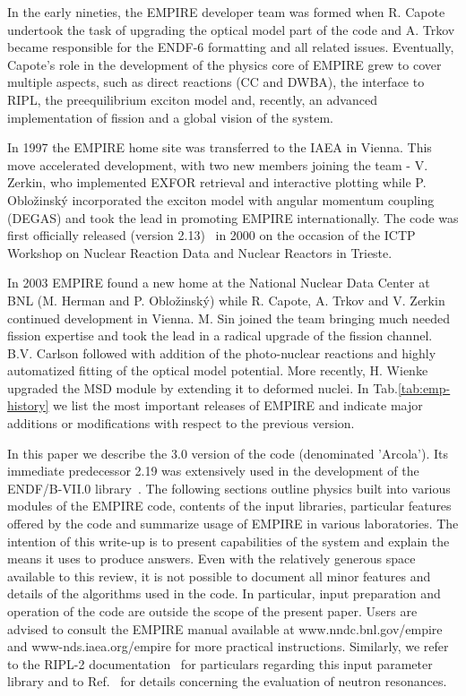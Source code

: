In the early nineties, the EMPIRE developer team was formed when R. Capote
undertook the task of upgrading the optical model part of the code and A.
Trkov became responsible for the ENDF-6 formatting and all related issues.
Eventually, Capote's role in the development of the physics core of EMPIRE
grew to cover multiple aspects, such as direct reactions (CC and
DWBA), the interface to RIPL, the preequilibrium exciton model and,
recently, an advanced
implementation of fission and a global vision of the system.

In 1997 the EMPIRE home site was transferred to the IAEA in Vienna. This move
accelerated development, with two new members joining the team - V.
Zerkin, who implemented EXFOR retrieval and interactive plotting
while P. Oblo\v
zinsk\'y incorporated the exciton model with angular momentum coupling (DEGAS)
and took the lead in promoting EMPIRE internationally. The code was first
officially released (version 2.13)~\cite{EMPIRE:Trieste01} in 2000 on the
occasion of the ICTP Workshop on Nuclear Reaction Data and Nuclear Reactors
in Trieste.

In 2003 EMPIRE found a new home at the National Nuclear Data Center at
BNL (M. Herman and P. Oblo\v{z}insk\'{y}) while R. Capote, A. Trkov and V.
Zerkin continued development in Vienna. M. Sin joined the team bringing
much needed fission expertise and took the lead in a radical upgrade of the
fission channel. B.V. Carlson followed with addition of the photo-nuclear
reactions and highly automatized fitting of the optical model potential.
More recently, H. Wienke upgraded the MSD module by extending it to
deformed nuclei. In Tab.\ref{tab:emp-history} we list the most important
releases of EMPIRE and indicate major additions or modifications with
respect to the previous version.

In this paper we describe the 3.0 version of the code (denominated
'Arcola'). Its immediate predecessor 2.19 was extensively used in the
development of the ENDF/B-VII.0 library~\cite{ENDF-VII}. The following
sections outline physics built into various modules of the EMPIRE
code, contents
of the input libraries, particular features offered by the code and
summarize usage of EMPIRE in various laboratories. The intention of this
write-up is to present capabilities of the system and explain the means it
uses to produce answers. Even with the relatively generous space available
to this review, it is not possible to document all minor features and details
of the algorithms used in the code. In particular, input preparation and
operation of the code are outside the scope of the present paper. Users are
advised to consult the EMPIRE manual available at www.nndc.bnl.gov/empire and
www-nds.iaea.org/empire for more practical instructions. Similarly, we refer
to the RIPL-2 documentation~\cite{RIPL2} for particulars regarding this input
parameter library and to Ref.~\cite{Mughabghab:06} for details
concerning the evaluation of neutron resonances.

